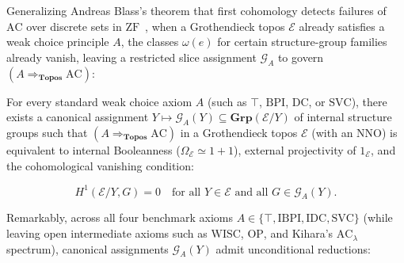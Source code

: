 Generalizing Andreas Blass's theorem that first cohomology detects failures of $\mathrm{AC}$ over discrete sets in $\mathrm{ZF}$~\cite{Blass83}, when a Grothendieck topos $\mathcal{E}$ already satisfies a weak choice principle $A$, the classes $\omega(e)$ for certain structure-group families already vanish, leaving a restricted slice assignment $\mathcal{G}_A$ to govern $(A \Rightarrow_{\mathbf{Topos}} \mathrm{AC})$:

\begin{conjecture}\label{conj:cohom-vanishing}

For every standard weak choice axiom $A$ (such as $\top$, $\mathrm{BPI}$, $\mathrm{DC}$, or $\mathrm{SVC}$), there exists a canonical assignment $Y \mapsto \mathcal{G}_A(Y) \subseteq \mathbf{Grp}(\mathcal{E}/Y)$ of internal structure groups such that $(A \Rightarrow_{\mathbf{Topos}} \mathrm{AC})$ in a Grothendieck topos $\mathcal{E}$ (with an $\mathrm{NNO}$) is equivalent to internal Booleanness ($\Omega_{\mathcal{E}} \simeq 1+1$), external projectivity of $1_{\mathcal{E}}$, and the cohomological vanishing condition:

\[
  H^1(\mathcal{E}/Y, G) = 0 \quad \text{for all } Y \in \mathcal{E} \text{ and all } G \in \mathcal{G}_A(Y).
\]

\end{conjecture}

Remarkably, across all four benchmark axioms $A \in \{\top, \mathrm{IBPI}, \mathrm{IDC}, \mathrm{SVC}\}$ (while leaving open intermediate axioms such as $\mathrm{WISC}$, $\mathrm{OP}$, and Kihara's $\mathrm{AC}_\lambda$ spectrum), canonical assignments $\mathcal{G}_A(Y)$ admit unconditional reductions:

